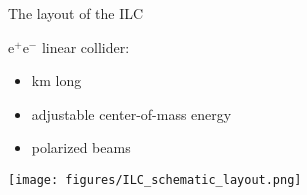 \begin{frame}{The layout of the ILC}
\ilclogo

e$^+$e$^-$ linear collider:
\begin{itemize}
 \item \unit[30]{km} long
 \item adjustable center-of-mass energy
 \item polarized beams
\end{itemize}
\begin{center}
\texttt{[image: figures/ILC\_schematic\_layout.png]}
\end{center}
\end{frame}
